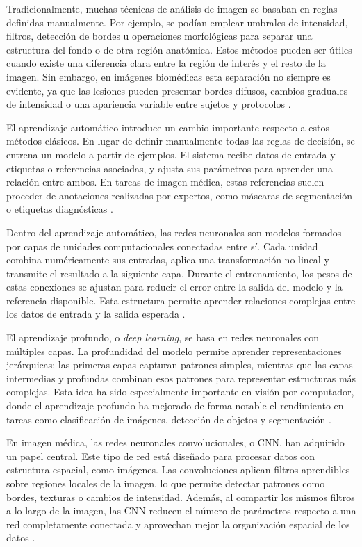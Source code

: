 Tradicionalmente, muchas técnicas de análisis de imagen se basaban en reglas definidas manualmente. Por ejemplo, se podían emplear umbrales de intensidad, filtros, detección de bordes u operaciones morfológicas para separar una estructura del fondo o de otra región anatómica. Estos métodos pueden ser útiles cuando existe una diferencia clara entre la región de interés y el resto de la imagen. Sin embargo, en imágenes biomédicas esta separación no siempre es evidente, ya que las lesiones pueden presentar bordes difusos, cambios graduales de intensidad o una apariencia variable entre sujetos y protocolos \citep{litjens2017survey,shen2017deep}.

El aprendizaje automático introduce un cambio importante respecto a estos métodos clásicos. En lugar de definir manualmente todas las reglas de decisión, se entrena un modelo a partir de ejemplos. El sistema recibe datos de entrada y etiquetas o referencias asociadas, y ajusta sus parámetros para aprender una relación entre ambos. En tareas de imagen médica, estas referencias suelen proceder de anotaciones realizadas por expertos, como máscaras de segmentación o etiquetas diagnósticas \citep{goodfellow2016deepLearning,litjens2017survey}.

Dentro del aprendizaje automático, las redes neuronales son modelos formados por capas de unidades computacionales conectadas entre sí. Cada unidad combina numéricamente sus entradas, aplica una transformación no lineal y transmite el resultado a la siguiente capa. Durante el entrenamiento, los pesos de estas conexiones se ajustan para reducir el error entre la salida del modelo y la referencia disponible. Esta estructura permite aprender relaciones complejas entre los datos de entrada y la salida esperada \citep{goodfellow2016deepLearning,lecun2015deepLearning}.

El aprendizaje profundo, o \textit{deep learning}, se basa en redes neuronales con múltiples capas. La profundidad del modelo permite aprender representaciones jerárquicas: las primeras capas capturan patrones simples, mientras que las capas intermedias y profundas combinan esos patrones para representar estructuras más complejas. Esta idea ha sido especialmente importante en visión por computador, donde el aprendizaje profundo ha mejorado de forma notable el rendimiento en tareas como clasificación de imágenes, detección de objetos y segmentación \citep{lecun2015deepLearning,krizhevsky2012imagenet}.

En imagen médica, las redes neuronales convolucionales, o CNN, han adquirido un papel central. Este tipo de red está diseñado para procesar datos con estructura espacial, como imágenes. Las convoluciones aplican filtros aprendibles sobre regiones locales de la imagen, lo que permite detectar patrones como bordes, texturas o cambios de intensidad. Además, al compartir los mismos filtros a lo largo de la imagen, las CNN reducen el número de parámetros respecto a una red completamente conectada y aprovechan mejor la organización espacial de los datos \citep{yamashita2018cnnRadiology,shen2017deep}.

